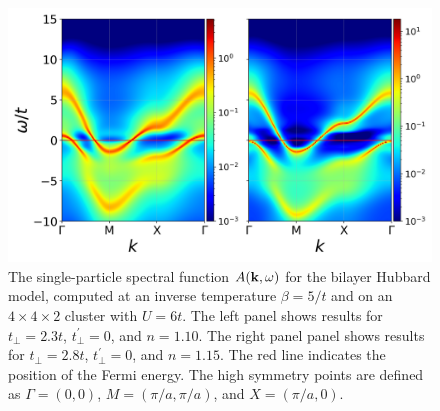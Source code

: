 \documentclass[prb,twocolumn,amsmath,amssymb,superscriptaddress,floatfix,nofootinbib]{revtex4-2}
\begin{document}
\begin{figure}[t]
\centering
\includegraphics[scale=0.34]{commonAKW_U6_n0pt9_vs_n0pt85_tp2pt3_vs_tp2pt8_bt5.png}
\caption{The single-particle spectral function $A({\bf k},\omega)$ for the bilayer Hubbard model, computed at an inverse temperature $\beta = 5/t$ and on an $4\times4\times2$ cluster with $U = 6t$. The left panel shows results for $t_{\perp} = 2.3t$, $t_\perp^\prime = 0$, and $n =1.10$. The right panel panel shows results for $t_{\perp} = 2.8t$, $t_\perp^\prime = 0$, and $n =1.15$. The red line indicates the position of the Fermi energy. The high symmetry points are defined as $\Gamma = (0,0)$, $M = (\pi/a,\pi/a)$, and $X = (\pi/a,0)$.}
\label{fig:Akwbulkinc}
\end{figure}
\end{document}
